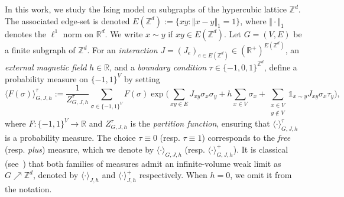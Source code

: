 \documentclass[10pt,a4paper]{amsart}
\numberwithin{equation}{section}
\begin{document}
In this work, we study the Ising model on subgraphs of the hypercubic lattice  $\mathbb Z^d$. The associated edge-set is denoted 
$E(\mathbb{Z}^d):=\{xy:\Vert x-y\Vert_1=1\}$, where $\Vert\cdot\Vert_1$ 
denotes the $\ell^1$ norm on $\mathbb{R}^d$. We write $x\sim y$ if $xy\in E(\mathbb Z^d)$. Let $G=(V,E)$ be a 
finite subgraph of $\mathbb{Z}^d$. For an \emph{interaction} 
$J=(J_e)_{e\in E(\mathbb Z^d)}\in(\mathbb{R}^+)^{E(\mathbb Z^d)}$, an \emph{external magnetic field} 
$h\in\mathbb{R}$, and a \emph{boundary condition} 
$\tau\in\{-1,0,1\}^{\mathbb{Z}^d}$, define a probability measure on 
$\{-1,1\}^V$ by setting
\begin{equation}
    \langle F(\sigma)\rangle_{G,J,h}^\tau
    :=\frac{1}{Z^\tau_{G,J,h}}\sum_{\sigma\in\{-1,1\}^V}F(\sigma)
    \exp\Big(\sum_{xy\in E}J_{xy}\sigma_x\sigma_y
    +h\sum_{x\in V}\sigma_x
    +\sum_{\substack{x\in V\\y\notin V}}
    \mathds{1}_{x\sim y}J_{xy}\sigma_x\tau_y\Big),
\end{equation}
where $F:\{-1,1\}^V\rightarrow\mathbb{R}$ and $Z^{\tau}_{G,J,h}$ is the 
\emph{partition function}, ensuring that $\langle\cdot\rangle_{G,J,h}^\tau$ 
is a probability measure. The choice $\tau\equiv 0$ (resp. $\tau\equiv 1$) corresponds to the 
\emph{free} (resp. \emph{plus}) measure, which we denote by 
$\langle\cdot\rangle_{G,J,h}$ (resp. $\langle\cdot\rangle_{G,J,h}^+$). 
It is classical 
(see~\cite{GriffithsCorrelationsIsing1-1967,GriffithsCorrelationsIsing2-1967}) 
that both families of measures admit an infinite-volume weak limit as 
$G\nearrow\mathbb{Z}^d$, denoted by $\langle\cdot\rangle_{J,h}$ and 
$\langle\cdot\rangle_{J,h}^+$ respectively. When $h=0$, we omit it from 
the notation.
\end{document}

